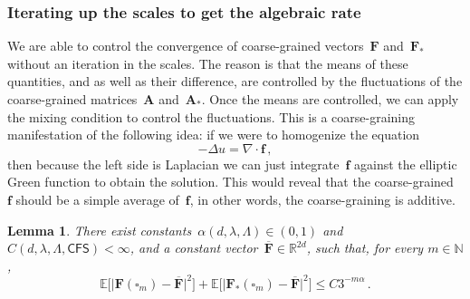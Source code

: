 \documentclass[11pt]{article} %
\let\oldsquare\square %
\renewcommand{\square}{\oldsquare}
\numberwithin{equation}{section}
\newtheorem{lemma}[theorem]{Lemma}
\theoremstyle{definition}
\newcommand*{\N}{\ensuremath{\mathbb{N}}}
\newcommand*{\R}{\ensuremath{\mathbb{R}}}
\newcommand{\f}{\mathbf{f}}
\newcommand{\cu}{\square}
\newcommand{\E}{\mathbb{E}}
\newcommand{\CFS}{\mathsf{CFS}}
\newcommand{\bfA}{\mathbf{A}}
\newcommand{\bfF}{\mathbf{F}}
\begin{document}
\subsubsection{Iterating up the scales to get the algebraic rate}

We are able to control the convergence of coarse-grained vectors~$\bfF$ and~$\bfF_*$ without an iteration in the scales. The reason is that the means of these quantities, and as well as their difference, are controlled by the fluctuations of the coarse-grained matrices~$\bfA$ and~$\bfA_*$. Once the means are controlled, we can apply the mixing condition to control the fluctuations. 
This is a coarse-graining manifestation of the following idea: if we were to homogenize the equation
\begin{equation*}
-\Delta u = \nabla \cdot \f \,,
\end{equation*}
then because the left side is Laplacian we can just integrate~$\f$ against the elliptic Green function to obtain the solution. This would reveal that the coarse-grained~$\f$ should be a simple average of~$\f$, in other words, the coarse-graining is additive. 

\begin{lemma} 
\label{l.bF.converge}
There exist constants~$\alpha(d,\lambda,\Lambda) \in (0,1)$ and~$C(d,\lambda,\Lambda,\CFS) < \infty$, and a constant vector~$\overline{\bfF} \in \R^{2d}$,  such that, for every $m \in \N$, 
\begin{equation}
\label{e.bfF.convergeE}
\E \Big[ \bigl| \bfF(\cu_m) - \overline{\bfF} \bigr|^2 \Bigr]
+
\E \Big[ \bigl| \bfF_*(\cu_m) - \overline{\bfF} \bigr|^2 \Bigr]
\leq 
C3^{-m\alpha}\,.
\end{equation}
\end{lemma}
\end{document}
